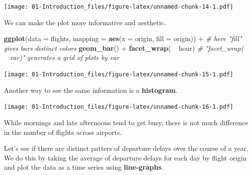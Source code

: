 \documentclass[]{book}
\newenvironment{Shaded}{\begin{snugshade}}{\end{snugshade}}
\newcommand{\KeywordTok}[1]{\textcolor[rgb]{0.13,0.29,0.53}{\textbf{{#1}}}}
\newcommand{\DataTypeTok}[1]{\textcolor[rgb]{0.13,0.29,0.53}{{#1}}}
\newcommand{\DecValTok}[1]{\textcolor[rgb]{0.00,0.00,0.81}{{#1}}}
\newcommand{\StringTok}[1]{\textcolor[rgb]{0.31,0.60,0.02}{{#1}}}
\newcommand{\CommentTok}[1]{\textcolor[rgb]{0.56,0.35,0.01}{\textit{{#1}}}}
\newcommand{\NormalTok}[1]{{#1}}
\theoremstyle{definition}
\theoremstyle{definition}
\theoremstyle{remark}
\begin{document}
\texttt{[image: 01-Introduction\_files/figure-latex/unnamed-chunk-14-1.pdf]}

We can make the plot more informative and aesthetic.

\begin{Shaded}
\begin{Highlighting}[]
\KeywordTok{ggplot}\NormalTok{(}\DataTypeTok{data =} \NormalTok{flights, }
       \DataTypeTok{mapping =} \KeywordTok{aes}\NormalTok{(}\DataTypeTok{x =} \NormalTok{origin, }\DataTypeTok{fill =} \NormalTok{origin)) +}\StringTok{  }\CommentTok{# here "fill" gives bars distinct colors }
\StringTok{  }\KeywordTok{geom_bar}\NormalTok{() +}\StringTok{  }
\StringTok{  }\KeywordTok{facet_wrap}\NormalTok{( ~}\StringTok{ }\NormalTok{hour)  }\CommentTok{#  "facet_wrap( ~ var)" generates a grid of plots by var }
\end{Highlighting}
\end{Shaded}

\texttt{[image: 01-Introduction\_files/figure-latex/unnamed-chunk-15-1.pdf]}

Another way to see the same information is a \textbf{histogram}.

\begin{Shaded}
\end{Shaded}

\texttt{[image: 01-Introduction\_files/figure-latex/unnamed-chunk-16-1.pdf]}

While mornings and late afternoons tend to get busy, there is not much
difference in the number of flights across airports.

Let's see if there are distinct patters of departure delays over the
course of a year. We do this by taking the average of departure delays
for each day by flight origin and plot the data as a time series using
\textbf{line-graphs}.
\end{document}

